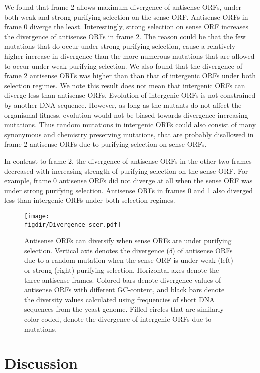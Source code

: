 \documentclass[12pt,a4paper]{article}
\begin{document}
We found that frame 2 allows maximum divergence of antisense ORFs, under both weak and strong purifying selection on the sense ORF. Antisense ORFs in frame 0 diverge the least. Interestingly, strong selection on sense ORF increases the divergence of antisense ORFs in frame 2. The reason could be that the few mutations that do occur under strong purifying selection, cause a relatively higher increase in divergence than the more numerous mutations that are allowed to occur under weak purifying selection. We also found that the divergence of frame 2 antisense ORFs was higher than than that of intergenic ORFs under both selection regimes. We note this result does not mean that intergenic ORFs can diverge less than antisense ORFs. Evolution of intergenic ORFs is not constrained by another DNA sequence. However, as long as the mutants do not affect the organismal fitness, evolution would not be biased towards divergence increasing mutations. Thus random mutations in intergenic ORFs could also consist of many synonymous and chemistry preserving mutations, that are probably disallowed in frame 2 antisense ORFs due to purifying selection on sense ORFs.

In contrast to frame 2, the divergence of antisense ORFs in the other two frames decreased with increasing strength of purifying selection on the sense ORF. For example, frame 0 antisense ORFs did not diverge at all when the sense ORF was under strong purifying selection. Antisense ORFs in frames 0 and 1 also diverged less than intergenic ORFs under both selection regimes. 


\begin{figure}[!t]
\centering
\texttt{[image: \\figdir/Divergence\_scer.pdf]}
\caption{Antisense ORFs can diversify when sense ORFs are under purifying selection. Vertical axis denotes the divergence ($\bar{\delta}$) of antisense ORFs due to a random mutation when the sense ORF is under weak (left) or strong (right) purifying selection. Horizontal axes denote the three antisense frames. Colored bars denote divergence values of antisense ORFs with different GC-content, and black bars denote the diversity values calculated using frequencies of short DNA sequences from the yeast genome. Filled circles that are similarly color coded, denote the divergence of intergenic ORFs due to mutations.}
\label{divergence}
\end{figure}
\section*{Discussion} 
\end{document}
